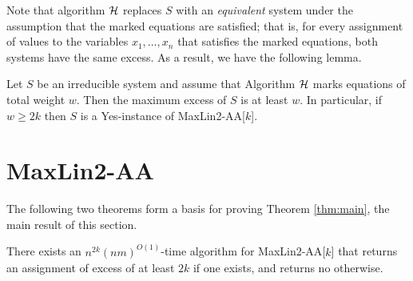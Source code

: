 \documentclass{llncs}
\begin{document}
Note that algorithm ${\cal H}$ replaces $S$ with an \emph{equivalent}
system under the assumption that the marked equations are satisfied; that
is, for every assignment of values to the variables $x_1, \ldots, x_n$ that
satisfies the marked equations, both systems have the same excess.
As a result, we have the following lemma.

\begin{lemma}\label{lemExcess}\cite{CroGutJonKimRuz10}
Let $S$ be an irreducible system and assume that Algorithm $\cal H$ marks equations of total weight $w$.
Then the maximum excess of $S$ is at least $w$.
In particular, if $w\ge 2k$ then $S$ is a {\sc Yes}-instance of {\sc MaxLin2-AA}[$k$].
\end{lemma}

\section{MaxLin2-AA}\label{sec:max-lin2}

The following two theorems form a basis for proving Theorem \ref{thm:main}, the main result of this section.

\begin{theorem}\label{thm:ing1}
There exists an $n^{2k}(nm)^{O(1)}$-time algorithm for {\sc MaxLin2-AA}[$k$] that returns an
assignment of excess of at least $2k$ if one exists, and returns {\sc no} otherwise.
\end{theorem}
\end{document}
